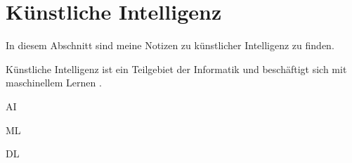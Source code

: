\section{Künstliche Intelligenz}
\label{sec:ai}

In diesem Abschnitt sind meine Notizen zu künstlicher Intelligenz zu finden.

Künstliche Intelligenz ist ein Teilgebiet der Informatik und beschäftigt sich mit maschinellem Lernen \citep{ai-wikipedia}.

AI\citep{ai-ibm}

ML\citep{machine-learning-ibm}

DL\citep{deep-learning-ibm}